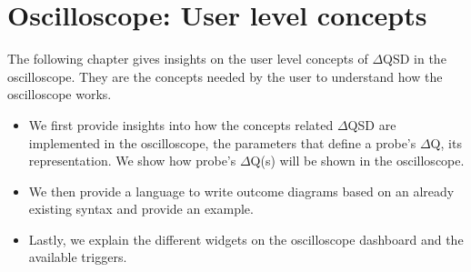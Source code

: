 \chapter{Oscilloscope: User level concepts}
    The following chapter gives insights on the user level concepts of $\Delta$QSD in the oscilloscope. They are the concepts needed by the user to understand how the oscilloscope works.
    \begin{itemize}
        \item We first provide insights into how the concepts related $\Delta$QSD are implemented in the oscilloscope, the parameters that define a probe's $\Delta$Q, its representation. We show how probe's $\Delta$Q(s) will be shown in the oscilloscope.
        \item We then provide a language to write outcome diagrams based on an already existing syntax and provide an example.
        \item Lastly, we explain the different widgets on the oscilloscope dashboard and the available triggers.
    \end{itemize}







